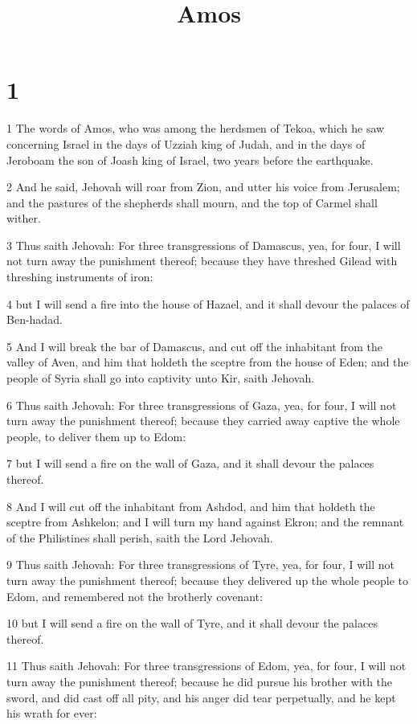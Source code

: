 

\title{Amos}

\chapter{1}

\par 1 The words of Amos, who was among the herdsmen of Tekoa, which he saw concerning Israel in the days of Uzziah king of Judah, and in the days of Jeroboam the son of Joash king of Israel, two years before the earthquake.
\par 2 And he said, Jehovah will roar from Zion, and utter his voice from Jerusalem; and the pastures of the shepherds shall mourn, and the top of Carmel shall wither.
\par 3 Thus saith Jehovah: For three transgressions of Damascus, yea, for four, I will not turn away the punishment thereof; because they have threshed Gilead with threshing instruments of iron:
\par 4 but I will send a fire into the house of Hazael, and it shall devour the palaces of Ben-hadad.
\par 5 And I will break the bar of Damascus, and cut off the inhabitant from the valley of Aven, and him that holdeth the sceptre from the house of Eden; and the people of Syria shall go into captivity unto Kir, saith Jehovah.
\par 6 Thus saith Jehovah: For three transgressions of Gaza, yea, for four, I will not turn away the punishment thereof; because they carried away captive the whole people, to deliver them up to Edom:
\par 7 but I will send a fire on the wall of Gaza, and it shall devour the palaces thereof.
\par 8 And I will cut off the inhabitant from Ashdod, and him that holdeth the sceptre from Ashkelon; and I will turn my hand against Ekron; and the remnant of the Philistines shall perish, saith the Lord Jehovah.
\par 9 Thus saith Jehovah: For three transgressions of Tyre, yea, for four, I will not turn away the punishment thereof; because they delivered up the whole people to Edom, and remembered not the brotherly covenant:
\par 10 but I will send a fire on the wall of Tyre, and it shall devour the palaces thereof.
\par 11 Thus saith Jehovah: For three transgressions of Edom, yea, for four, I will not turn away the punishment thereof; because he did pursue his brother with the sword, and did cast off all pity, and his anger did tear perpetually, and he kept his wrath for ever:
